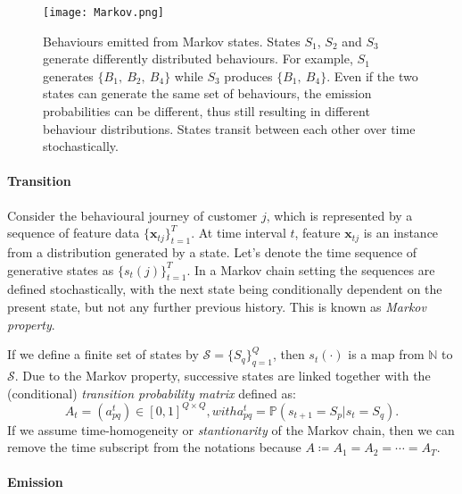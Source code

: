 \begin{figure}[!h]
\centering
\texttt{[image: Markov.png]}
\caption{Behaviours emitted from Markov states. States $S_1$, $S_2$ and $S_3$ generate differently distributed behaviours. For example, $S_1$ generates $\{ B_1, ~B_2, ~B_4\}$ while $S_3$ produces $\{ B_1, ~B_4\}$. Even if the two states can generate the same set of behaviours, the emission probabilities can be different, thus still resulting in different behaviour distributions. States transit between each other over time stochastically.}
\label{fig:markovChain}
\end{figure}

\paragraph*{Transition}

Consider the behavioural journey of customer $j$, which is represented by a sequence of feature data $\{ \mathbf{x}_{tj} \}_{t=1}^{T}$. At time interval $t$, feature $\mathbf{x}_{tj}$ is an instance from a distribution generated by a state. Let's denote the time sequence of generative states as $\{ s_{t}(j) \}_{t=1}^{T}$. In a Markov chain setting the sequences are defined stochastically, with the next state being conditionally dependent on the present state, but not any further previous history. This is known as \textit{Markov property}. 

If we define a finite set of states by $\mathcal{S} = \{ S_q \}_{q=1}^Q$, then $s_t (\cdot)$ is a map from $\mathbb{N}$ to $\mathcal{S}$. Due to the Markov property, successive states are linked together with the (conditional) \textit{transition probability matrix} defined as:
\begin{subequations}
\begin{equation}
A_t = (a_{pq}^t) \in [0,1]^{Q \times Q}, 
\end{equation}
with
\begin{equation}
a_{pq}^t = \mathbb{P} \left( s_{t+1} = S_p | s_t = S_q \right).
\end{equation}
\label{eq:transition}
\end{subequations}
If we assume time-homogeneity or \textit{stantionarity} of the Markov chain, then we can remove the time subscript from the notations because $A \coloneqq A_1 = A_2 = \cdots = A_T$.

\paragraph*{Emission}

